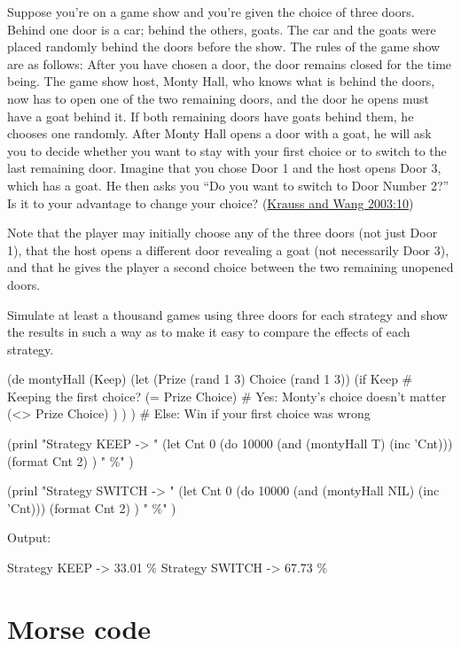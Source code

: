 Suppose you're on a game show and you're given the choice of three
doors. Behind one door is a car; behind the others, goats. The car and
the goats were placed randomly behind the doors before the show. The
rules of the game show are as follows: After you have chosen a door, the
door remains closed for the time being. The game show host, Monty Hall,
who knows what is behind the doors, now has to open one of the two
remaining doors, and the door he opens must have a goat behind it. If
both remaining doors have goats behind them, he chooses one randomly.
After Monty Hall opens a door with a goat, he will ask you to decide
whether you want to stay with your first choice or to switch to the last
remaining door. Imagine that you chose Door 1 and the host opens Door 3,
which has a goat. He then asks you ``Do you want to switch to Door
Number 2?'' Is it to your advantage to change your choice?
(\href{http://www.usd.edu/~xtwang/Papers/MontyHallPaper.pdf}{Krauss and
Wang 2003:10})

Note that the player may initially choose any of the three doors (not
just Door 1), that the host opens a different door revealing a goat (not
necessarily Door 3), and that he gives the player a second choice
between the two remaining unopened doors.

Simulate at least a thousand games using three doors for each strategy
and show the results in such a way as to make it easy to compare the
effects of each strategy.


\begin{wideverbatim}

(de montyHall (Keep)
   (let (Prize (rand 1 3)  Choice (rand 1 3))
      (if Keep                    # Keeping the first choice?
         (= Prize Choice)         # Yes: Monty's choice doesn't matter
         (<> Prize Choice) ) ) )  # Else: Win if your first choice was wrong

(prinl
   "Strategy KEEP    -> "
   (let Cnt 0
      (do 10000 (and (montyHall T) (inc 'Cnt)))
      (format Cnt 2) )
   " \%" )

(prinl
   "Strategy SWITCH  -> "
   (let Cnt 0
      (do 10000 (and (montyHall NIL) (inc 'Cnt)))
      (format Cnt 2) )
   " \%" )

Output:

Strategy KEEP    -> 33.01 \%
Strategy SWITCH  -> 67.73 \%

\end{wideverbatim}

\pagebreak{}
\section*{Morse code}

